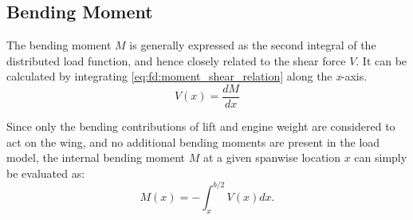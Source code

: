\subsection*{Bending Moment}
The bending moment $M$ is generally expressed as the second integral of the distributed load function, and hence closely related to the shear force $V$. It can be calculated by integrating \autoref{eq:fd:moment_shear_relation} \cite[p.28]{Timmer2024AE2111-IReader} along the \textit{x}-axis.
\begin{equation}    \label{eq:fd:moment_shear_relation}
    V(x)=\frac{dM}{dx}
\end{equation}

\noindent Since only the bending contributions of lift and engine weight are considered to act on the wing, and no additional bending moments are present in the load model, the internal bending moment $M$ at a given spanwise location $x$ can simply be evaluated as:
\begin{equation*}
    M(x)=-\int^{b/2}_x V(x)dx.
\end{equation*}



